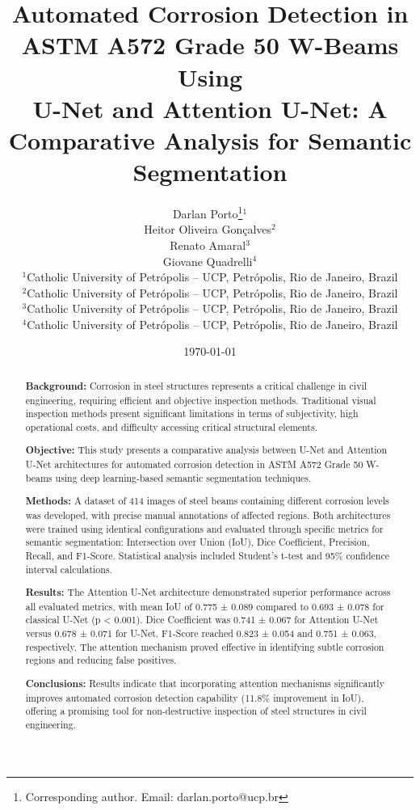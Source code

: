 \documentclass[12pt,a4paper,twoside]{article}
\title{%
    Automated Corrosion Detection in ASTM A572 Grade 50 W-Beams Using \\
    U-Net and Attention U-Net: A Comparative Analysis for Semantic Segmentation%
}
\author{%
    Darlan Porto\thanks{Corresponding author. Email: darlan.porto@ucp.br}$^1$ \\
    Heitor Oliveira Gonçalves$^2$ \\
    Renato Amaral$^3$ \\
    Giovane Quadrelli$^4$ \\[0.5em]
    \small $^1$Catholic University of Petrópolis – UCP, Petrópolis, Rio de Janeiro, Brazil \\
    \small $^2$Catholic University of Petrópolis – UCP, Petrópolis, Rio de Janeiro, Brazil \\
    \small $^3$Catholic University of Petrópolis – UCP, Petrópolis, Rio de Janeiro, Brazil \\
    \small $^4$Catholic University of Petrópolis – UCP, Petrópolis, Rio de Janeiro, Brazil
}
\date{\today}
\begin{document}

\maketitle

\thispagestyle{empty}


\begin{abstract}
\noindent \textbf{Background:} Corrosion in steel structures represents a critical challenge in civil engineering, requiring efficient and objective inspection methods. Traditional visual inspection methods present significant limitations in terms of subjectivity, high operational costs, and difficulty accessing critical structural elements.

\noindent \textbf{Objective:} This study presents a comparative analysis between U-Net and Attention U-Net architectures for automated corrosion detection in ASTM A572 Grade 50 W-beams using deep learning-based semantic segmentation techniques.

\noindent \textbf{Methods:} A dataset of 414 images of steel beams containing different corrosion levels was developed, with precise manual annotations of affected regions. Both architectures were trained using identical configurations and evaluated through specific metrics for semantic segmentation: Intersection over Union (IoU), Dice Coefficient, Precision, Recall, and F1-Score. Statistical analysis included Student's t-test and 95\% confidence interval calculations.

\noindent \textbf{Results:} The Attention U-Net architecture demonstrated superior performance across all evaluated metrics, with mean IoU of 0.775 ± 0.089 compared to 0.693 ± 0.078 for classical U-Net (p < 0.001). Dice Coefficient was 0.741 ± 0.067 for Attention U-Net versus 0.678 ± 0.071 for U-Net. F1-Score reached 0.823 ± 0.054 and 0.751 ± 0.063, respectively. The attention mechanism proved effective in identifying subtle corrosion regions and reducing false positives.

\noindent \textbf{Conclusions:} Results indicate that incorporating attention mechanisms significantly improves automated corrosion detection capability (11.8\% improvement in IoU), offering a promising tool for non-destructive inspection of steel structures in civil engineering.
\end{abstract}
\end{document}
